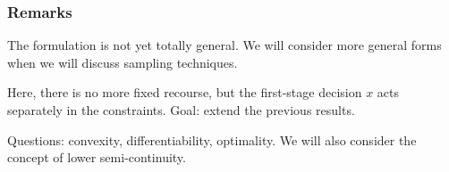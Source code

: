 \documentclass{beamer}
\begin{document}
\begin{frame}
\frametitle{Remarks}

The formulation is not yet totally general.
We will consider more general forms when we will discuss sampling techniques.

\mbox{}

Here, there is no more fixed recourse, but the first-stage decision $x$ acts separately in the constraints.
Goal: extend the previous results.

\mbox{}

Questions: convexity, differentiability, optimality.
We will also consider the concept of lower semi-continuity.

\end{frame}
\end{document}
